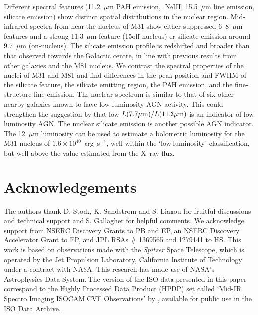 \documentclass[useAMS,usenatbib,a4paper]{mn2e}
\begin{document}
Different spectral features (11.2~$\mu$m PAH emission, [NeIII] 15.5~$\mu$m line emission, silicate emission) show distinct spatial distributions in the nuclear region. Mid-infrared spectra from near the nucleus of M31 show either suppressed 6--8~$\mu$m features and a strong 11.3~$\mu$m feature
(15\arcsec off-nucleus) or silicate emission around 9.7~$\mu$m  (on-nucleus). The silicate emission profile is redshifted and broader than that observed towards the Galactic centre, in line with previous results from other galaxies and the M81 nucleus.  We contrast the spectral properties of the nuclei of M31 and M81 and find differences in the peak position and FWHM of the silicate feature, the silicate emitting region, the PAH emission, and the fine-structure line emission. 
The nuclear spectrum is similar to that of six other nearby galaxies known to have low luminosity AGN activity. This could strengthen the
suggestion by \citet{Smith:2007lr} that low $L(7.7\mu{\rm m})/L(11.3\mu{\rm m})$ is an indicator of low luminosity AGN. 
The nuclear silicate emission is another possible AGN indicator.
The 12~$\mu$m luminosity can be used to estimate a bolometric luminosity for the M31 nucleus of $1.6\times 10^{40}$~erg~s$^{-1}$,
well within the `low-luminosity' classification, but well above the value estimated from the X--ray flux.


\section*{Acknowledgements}

The authors thank D. Stock, K. Sandstrom and S. Lianou for fruitful discussions and technical support
and S. Gallagher for helpful comments.
We acknowledge support from NSERC Discovery Grants to PB and EP, an NSERC Discovery Accelerator Grant to EP,
and JPL RSAs \# 1369565 and 1279141 to HS.
This work is based on observations made with the {\em Spitzer} Space Telescope, which is operated by the 
Jet Propulsion Laboratory, California Institute of Technology under a contract with NASA.
This research has made use of NASA's Astrophysics Data System.
The version of the ISO data presented in this paper correspond to the Highly Processed Data Product (HPDP) set called `Mid-IR Spectro Imaging ISOCAM CVF Observations'
by \citet{Boulanger_F_2005}, available for public use in the ISO Data Archive.
\end{document}
